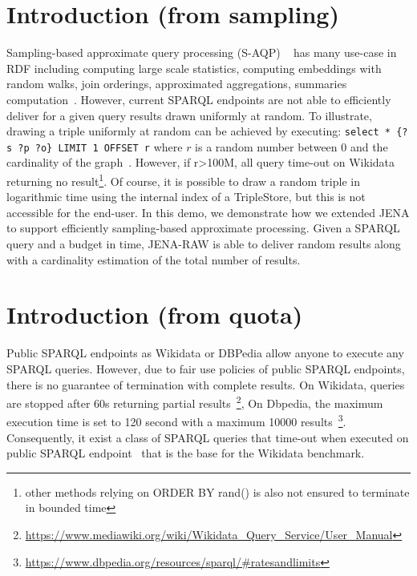 
\section{Introduction (from sampling)}

Sampling-based approximate query processing (S-AQP)
~\cite{DBLP:conf/sigmod/AgarwalMKTJMMS14} has many use-case in RDF
including computing large scale
statistics\cite{soulet2019anytime,10.1007/978-3-319-18818-8_14},
computing embeddings with random walks\cite{ristoski2016rdf2vec}, join
orderings\cite{DBLP:conf/cidr/LeisRGK017}, approximated
aggregations\cite{DBLP:journals/tods/LiWYZ19}, summaries
computation~\cite{10.1007/978-3-030-49461-2_10}. However, current
SPARQL endpoints are not able to efficiently deliver for a given query
results drawn uniformly at random. To illustrate, drawing a triple
uniformly at random can be achieved by executing:
%
\verb+select * {?s ?p ?o} LIMIT 1 OFFSET r+
%
where $r$ is a random number between 0 and the cardinality of the
graph~\cite{soulet2019anytime}. However, if r>100M, all query time-out
on Wikidata returning no result\footnote{other methods relying on
  ORDER BY rand() is also not ensured to terminate in bounded time
}. Of course, it is possible to draw a random triple in logarithmic
time using the internal index of a TripleStore, but this is not
accessible for the end-user. In this demo, we demonstrate how we
extended JENA to support efficiently sampling-based approximate
processing. Given a SPARQL query and a budget in time, JENA-RAW is
able to deliver random results along with a cardinality estimation of
the total number of results.






\section{Introduction (from quota)}

Public SPARQL endpoints as Wikidata or DBPedia allow anyone to execute
any SPARQL queries. However, due to fair use policies of public SPARQL
endpoints, there is no guarantee of termination with complete
results. On Wikidata, queries are stopped after 60s returning partial
results~\footnote{\url{https://www.mediawiki.org/wiki/Wikidata_Query_Service/User_Manual}},
On Dbpedia, the maximum execution time is set to 120 second with a
maximum 10000
results~\footnote{\url{https://www.dbpedia.org/resources/sparql/#ratesandlimits}}. Consequently,
it exist a class of SPARQL queries that time-out when executed on
public SPARQL endpoint~\cite{DBLP:conf/semweb/MalyshevKGGB18} that is
the base for the Wikidata benchmark\cite{angles2022wdbench}.


